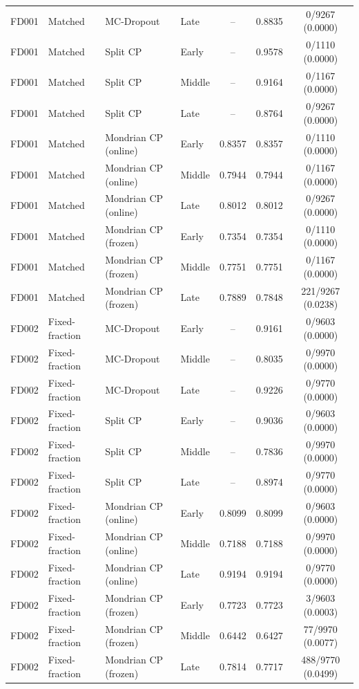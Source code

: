 \begin{table}[t]
\begin{tabular}{llllccc}
FD001 & Matched & MC-Dropout & Late & -- & 0.8835 & 0/9267 (0.0000) \\
FD001 & Matched & Split CP & Early & -- & 0.9578 & 0/1110 (0.0000) \\
FD001 & Matched & Split CP & Middle & -- & 0.9164 & 0/1167 (0.0000) \\
FD001 & Matched & Split CP & Late & -- & 0.8764 & 0/9267 (0.0000) \\
FD001 & Matched & Mondrian CP (online) & Early & 0.8357 & 0.8357 & 0/1110 (0.0000) \\
FD001 & Matched & Mondrian CP (online) & Middle & 0.7944 & 0.7944 & 0/1167 (0.0000) \\
FD001 & Matched & Mondrian CP (online) & Late & 0.8012 & 0.8012 & 0/9267 (0.0000) \\
FD001 & Matched & Mondrian CP (frozen) & Early & 0.7354 & 0.7354 & 0/1110 (0.0000) \\
FD001 & Matched & Mondrian CP (frozen) & Middle & 0.7751 & 0.7751 & 0/1167 (0.0000) \\
FD001 & Matched & Mondrian CP (frozen) & Late & 0.7889 & 0.7848 & 221/9267 (0.0238) \\
FD002 & Fixed-fraction & MC-Dropout & Early & -- & 0.9161 & 0/9603 (0.0000) \\
FD002 & Fixed-fraction & MC-Dropout & Middle & -- & 0.8035 & 0/9970 (0.0000) \\
FD002 & Fixed-fraction & MC-Dropout & Late & -- & 0.9226 & 0/9770 (0.0000) \\
FD002 & Fixed-fraction & Split CP & Early & -- & 0.9036 & 0/9603 (0.0000) \\
FD002 & Fixed-fraction & Split CP & Middle & -- & 0.7836 & 0/9970 (0.0000) \\
FD002 & Fixed-fraction & Split CP & Late & -- & 0.8974 & 0/9770 (0.0000) \\
FD002 & Fixed-fraction & Mondrian CP (online) & Early & 0.8099 & 0.8099 & 0/9603 (0.0000) \\
FD002 & Fixed-fraction & Mondrian CP (online) & Middle & 0.7188 & 0.7188 & 0/9970 (0.0000) \\
FD002 & Fixed-fraction & Mondrian CP (online) & Late & 0.9194 & 0.9194 & 0/9770 (0.0000) \\
FD002 & Fixed-fraction & Mondrian CP (frozen) & Early & 0.7723 & 0.7723 & 3/9603 (0.0003) \\
FD002 & Fixed-fraction & Mondrian CP (frozen) & Middle & 0.6442 & 0.6427 & 77/9970 (0.0077) \\
FD002 & Fixed-fraction & Mondrian CP (frozen) & Late & 0.7814 & 0.7717 & 488/9770 (0.0499) \\

\end{tabular}
\end{table}
